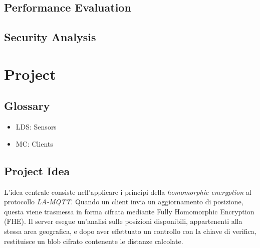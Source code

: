\documentclass[12pt,a4paper,twoside]{book}
\begin{document}
\section{Performance Evaluation}

\section{Security Analysis}

\chapter{Project}
\section{Glossary}
\begin{itemize}
    \item LDS: Sensors
    \item MC: Clients
\end{itemize}

\section{Project Idea}
L'idea centrale consiste nell'applicare i principi della \emph{homomorphic encryption} al protocollo \emph{LA-MQTT}. Quando un client invia un aggiornamento di posizione, questa viene trasmessa in forma cifrata mediante Fully Homomorphic Encryption (FHE). Il server esegue un'analisi sulle posizioni disponibili, appartenenti alla stessa area geografica, e dopo aver effettuato un controllo con la chiave di verifica, restituisce un blob cifrato contenente le distanze calcolate.
\end{document}
